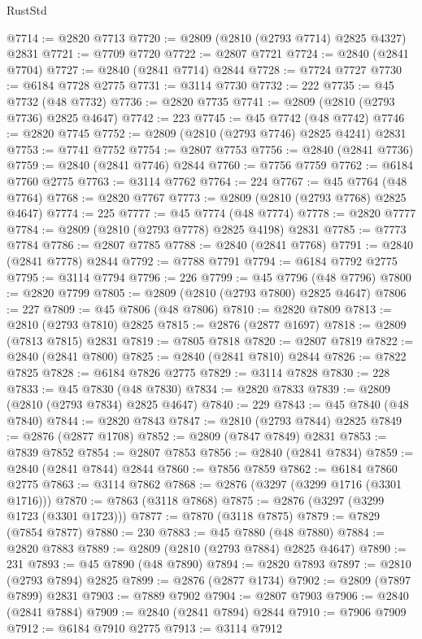 \begin{lexlean}{RustStd}
\begin{coremodule}
{\begin{coremodule}
{{{{{{{{{{{{{{{{{{{{{{{{{{{{{{{{{@7714 := @2820 @7713
@7720 := @2809 (@2810 (@2793 @7714) @2825 @4327) @2831
@7721 := @7709 @7720
@7722 := @2807 @7721
@7724 := @2840 (@2841 @7704)
@7727 := @2840 (@2841 @7714) @2844
@7728 := @7724 @7727
@7730 := @6184 @7728 @2775
@7731 := @3114 @7730
@7732 := 222
@7735 := @45 @7732 (@48 @7732)
@7736 := @2820 @7735
@7741 := @2809 (@2810 (@2793 @7736) @2825 @4647)
@7742 := 223
@7745 := @45 @7742 (@48 @7742)
@7746 := @2820 @7745
@7752 := @2809 (@2810 (@2793 @7746) @2825 @4241) @2831
@7753 := @7741 @7752
@7754 := @2807 @7753
@7756 := @2840 (@2841 @7736)
@7759 := @2840 (@2841 @7746) @2844
@7760 := @7756 @7759
@7762 := @6184 @7760 @2775
@7763 := @3114 @7762
@7764 := 224
@7767 := @45 @7764 (@48 @7764)
@7768 := @2820 @7767
@7773 := @2809 (@2810 (@2793 @7768) @2825 @4647)
@7774 := 225
@7777 := @45 @7774 (@48 @7774)
@7778 := @2820 @7777
@7784 := @2809 (@2810 (@2793 @7778) @2825 @4198) @2831
@7785 := @7773 @7784
@7786 := @2807 @7785
@7788 := @2840 (@2841 @7768)
@7791 := @2840 (@2841 @7778) @2844
@7792 := @7788 @7791
@7794 := @6184 @7792 @2775
@7795 := @3114 @7794
@7796 := 226
@7799 := @45 @7796 (@48 @7796)
@7800 := @2820 @7799
@7805 := @2809 (@2810 (@2793 @7800) @2825 @4647)
@7806 := 227
@7809 := @45 @7806 (@48 @7806)
@7810 := @2820 @7809
@7813 := @2810 (@2793 @7810) @2825
@7815 := @2876 (@2877 @1697)
@7818 := @2809 (@7813 @7815) @2831
@7819 := @7805 @7818
@7820 := @2807 @7819
@7822 := @2840 (@2841 @7800)
@7825 := @2840 (@2841 @7810) @2844
@7826 := @7822 @7825
@7828 := @6184 @7826 @2775
@7829 := @3114 @7828
@7830 := 228
@7833 := @45 @7830 (@48 @7830)
@7834 := @2820 @7833
@7839 := @2809 (@2810 (@2793 @7834) @2825 @4647)
@7840 := 229
@7843 := @45 @7840 (@48 @7840)
@7844 := @2820 @7843
@7847 := @2810 (@2793 @7844) @2825
@7849 := @2876 (@2877 @1708)
@7852 := @2809 (@7847 @7849) @2831
@7853 := @7839 @7852
@7854 := @2807 @7853
@7856 := @2840 (@2841 @7834)
@7859 := @2840 (@2841 @7844) @2844
@7860 := @7856 @7859
@7862 := @6184 @7860 @2775
@7863 := @3114 @7862
@7868 := @2876 (@3297 (@3299 @1716 (@3301 @1716)))
@7870 := @7863 (@3118 @7868)
@7875 := @2876 (@3297 (@3299 @1723 (@3301 @1723)))
@7877 := @7870 (@3118 @7875)
@7879 := @7829 (@7854 @7877)
@7880 := 230
@7883 := @45 @7880 (@48 @7880)
@7884 := @2820 @7883
@7889 := @2809 (@2810 (@2793 @7884) @2825 @4647)
@7890 := 231
@7893 := @45 @7890 (@48 @7890)
@7894 := @2820 @7893
@7897 := @2810 (@2793 @7894) @2825
@7899 := @2876 (@2877 @1734)
@7902 := @2809 (@7897 @7899) @2831
@7903 := @7889 @7902
@7904 := @2807 @7903
@7906 := @2840 (@2841 @7884)
@7909 := @2840 (@2841 @7894) @2844
@7910 := @7906 @7909
@7912 := @6184 @7910 @2775
@7913 := @3114 @7912
}}}}}}}}}}}}}}}}}}}}}}}}}}}}}}}}}
\end{coremodule}}
\end{coremodule}
\end{lexlean}
